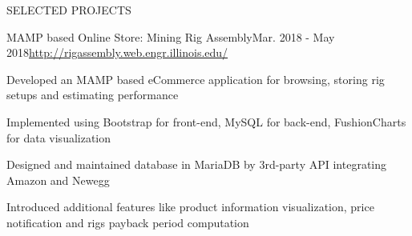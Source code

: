 \documentclass{resume} %
\begin{document}
\begin{rSection}{SELECTED PROJECTS}

\begin{rSubsection}{MAMP based Online Store: Mining Rig Assembly}{Mar. 2018 - May 2018}{\url{http://rigassembly.web.engr.illinois.edu/}}{}
\item Developed an MAMP based eCommerce application for browsing, storing rig setups and estimating performance
\item Implemented using Bootstrap for front-end, MySQL for back-end, FushionCharts for data visualization
\item Designed and maintained database in MariaDB by 3rd-party API integrating Amazon and Newegg
\item Introduced additional features like product information visualization, price notification and rigs payback period computation
\end{rSubsection}


\end{rSection} 
\end{document}
